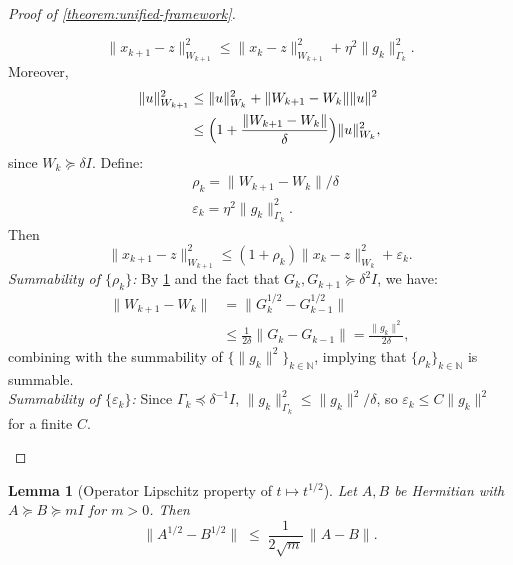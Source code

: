 \documentclass{article}
\theoremstyle{plain}
\newtheorem{lemma}[theorem]{Lemma}
\theoremstyle{definition}
\theoremstyle{remark}
\newcommand{\norm}[1]{\| #1 \|}
\newcommand{\normW}[2]{\| #1 \|_{#2}}
\newcommand*{\NN}{\mathbb{N}}
\begin{document}
\begin{proof}[Proof of \cref{theorem:unified-framework}]
\begin{enumerate}[leftmargin=*]
\begin{equation}\label{eq:adafull-after-convexity}
  \normW{x_{k+1}-z}{W_{k+1}}^2
  \leq \normW{x_k-z}{W_{k+1}}^2 + \eta^2\normW{g_k}{\Gamma_k}^2.
\end{equation}
Moreover,
\begin{align*}
  \normW{u}{W_{k+1}}^2 & \leq \normW{u}{W_k}^2 + \norm{W_{k+1}-W_k}\norm{u}^2 \\
  & \leq \Bigl(1 + \frac{\norm{W_{k+1}-W_k}}{\delta}\Bigr) \normW{u}{W_k}^2,
\end{align*}
since $W_k \succeq \delta I$. Define:
\begin{align*}
& \rho_k = \norm{W_{k+1}-W_k}/\delta \\
& \varepsilon_k = \eta^2\normW{g_k}{\Gamma_k}^2.
\end{align*}
Then
\[
  \normW{x_{k+1}-z}{W_{k+1}}^2
  \leq (1+\rho_k)\normW{x_k-z}{W_k}^2 + \varepsilon_k.
\]
%
\emph{Summability of $\{\rho_k\}$:}
By \cref{lem:sqrt-lip} and the fact that $G_{k}, G_{k + 1} \succeq \delta^2 I$, we have:
\begin{align*}
    \norm{W_{k+1} - W_k} &= \norm{G_{k}^{1/2} - G_{k-1}^{1/2}} \\
  &\leq \frac{1}{2\delta}\norm{G_{k} - G_{k-1}} = \frac{\norm{g_{k}}^2}{2\delta},
\end{align*}
combining with the summability of $\{\|g_k\|^2\}_{k\in\NN}$, implying that $\{\rho_k\}_{k\in\NN}$ is summable.\\
%
\emph{Summability of $\{\varepsilon_k\}$:}
Since $\Gamma_k \preceq \delta^{-1}I$,
$\normW{g_k}{\Gamma_k}^2 \leq \norm{g_k}^2/\delta$, so
$\varepsilon_k \leq C\norm{g_k}^2$ for a finite $C$.
\end{enumerate}
\end{proof}

\begin{lemma}[Operator Lipschitz property of $t \mapsto t^{1/2}$]
\label{lem:sqrt-lip}
Let $A, B$ be Hermitian with $A \succeq B \succeq mI$ for $m > 0$.
Then
\begin{equation}\label{eq:sqrt-lip}
  \norm{A^{1/2} - B^{1/2}}
  \;\leq\; \frac{1}{2\sqrt{m}}\,\norm{A - B}.
\end{equation}
\end{lemma}
\end{document}
